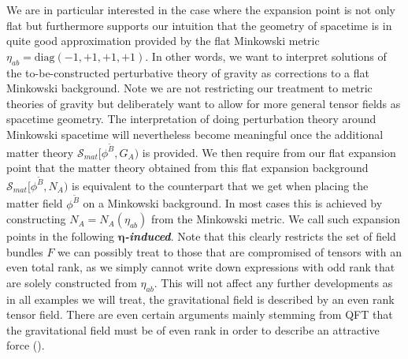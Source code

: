 \documentclass[a4paper,12pt, DIV=14, BCOR=5mm, twoside, headsepline, numbers=noenddot]{scrbook}
\begin{document}
We are in particular interested in the case where the expansion point is not only flat but furthermore supports our intuition that the geometry of spacetime is in quite good approximation provided by the flat Minkowski metric $\eta_{ab} = \mathrm{diag}(-1,+1,+1,+1)$. 
%
%
In other words, we want to interpret solutions of the to-be-constructed perturbative theory of gravity as corrections to a flat Minkowski background. Note we are not restricting our treatment to metric theories of gravity but deliberately want to allow for more general tensor fields as spacetime geometry.
The interpretation of doing perturbation theory around Minkowski spacetime will nevertheless become meaningful once the additional matter theory $\mathcal{S}_{mat}[\phi^{\tilde{B}},G_A)$ is provided. We then require from our flat expansion point that the matter theory obtained from this flat expansion background $\mathcal{S}_{mat}[\phi^{\tilde{B}},N_A)$ is equivalent to the counterpart that we get when placing the matter field $\phi^{\tilde{B}}$ on a Minkowski background. 
In most cases this is achieved by constructing $N_A = N_A(\eta_{ab})$ from the Minkowski metric. We call such expansion points in the following \textit{\textbf{$\boldsymbol{\eta}$-induced}}. Note that this clearly restricts the set of field bundles $F$ we can possibly treat to those that are compromised of tensors with an even total rank, as we simply cannot write down expressions with odd rank that are solely constructed from $\eta_{ab}$. This will not affect any further developments as in all examples we will treat, the gravitational field is described by an even rank tensor field. There are even certain arguments mainly stemming from QFT that the gravitational field must be of even rank in order to describe an attractive force (\cite{vecchiato2017variational}). 
\end{document}
